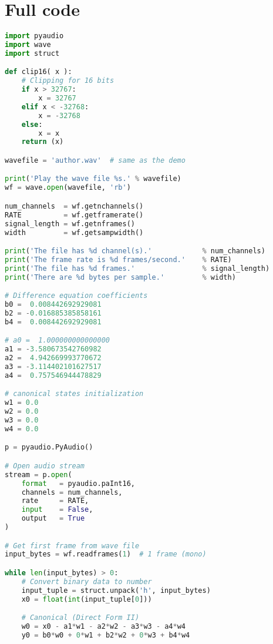 \documentclass[11pt]{article}
\begin{document}

\pagebreak

\section*{Full code}

\begin{lstlisting}[language=python, label={lst:code}, breaklines=true, caption={example code}]
import pyaudio
import wave
import struct

def clip16( x ):    
    # Clipping for 16 bits
    if x > 32767:
        x = 32767
    elif x < -32768:
        x = -32768
    else:
        x = x        
    return (x)

wavefile = 'author.wav'  # same as the demo

print('Play the wave file %s.' % wavefile)
wf = wave.open(wavefile, 'rb')

num_channels  = wf.getnchannels()
RATE          = wf.getframerate()
signal_length = wf.getnframes()
width         = wf.getsampwidth()

print('The file has %d channel(s).'            % num_channels)
print('The frame rate is %d frames/second.'    % RATE)
print('The file has %d frames.'                % signal_length)
print('There are %d bytes per sample.'         % width)

# Difference equation coefficients
b0 =  0.008442692929081
b2 = -0.016885385858161
b4 =  0.008442692929081

# a0 =  1.000000000000000
a1 = -3.580673542760982
a2 =  4.942669993770672
a3 = -3.114402101627517
a4 =  0.757546944478829

# canonical states initialization
w1 = 0.0
w2 = 0.0
w3 = 0.0
w4 = 0.0

p = pyaudio.PyAudio()

# Open audio stream
stream = p.open(
    format   = pyaudio.paInt16,
    channels = num_channels,
    rate     = RATE,
    input    = False,
    output   = True
)

# Get first frame from wave file
input_bytes = wf.readframes(1)  # 1 frame (mono)

while len(input_bytes) > 0:
    # Convert binary data to number
    input_tuple = struct.unpack('h', input_bytes)
    x0 = float(int(input_tuple[0]))

    # Canonical (Direct Form II)
    w0 = x0 - a1*w1 - a2*w2 - a3*w3 - a4*w4
    y0 = b0*w0 + 0*w1 + b2*w2 + 0*w3 + b4*w4


\end{lstlisting}
\end{document}
